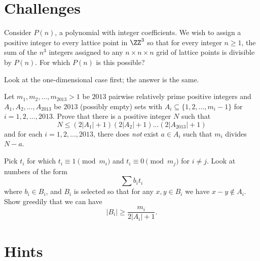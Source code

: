 \documentclass[11pt]{scrartcl}
\begin{document}
\section{Challenges}
\begin{problem}
  Consider $P(n)$, a polynomial with integer coefficients.
  We wish to assign a positive integer to every lattice point in
  $\ZZ^3$ so that for every integer $n \ge 1$,
  the sum of the $n^3$ integers assigned to any $n \times n \times n$ grid
  of lattice points is divisible by $P(n)$.
  For which $P(n)$ is this possible?
  \begin{hint}
    Look at the one-dimensional case first;
    the answer is the same.
  \end{hint}
\end{problem}

\begin{problem}
  Let $m_1,m_2,\ldots,m_{2013} > 1$ be $2013$
  pairwise relatively prime positive integers
  and $A_1,A_2,\ldots,A_{2013}$ be $2013$ (possibly empty) sets
  with $A_i\subseteq \{1,2,\ldots,m_i-1\}$ for $i=1,2,\ldots,2013$.
  Prove that there is a positive integer $N$ such that
   \[ N \le \left( 2\left\lvert A_1 \right\rvert + 1 \right)
     \left( 2\left\lvert A_2 \right\rvert + 1 \right)
     \dots\left( 2\left\lvert A_{2013} \right\rvert + 1 \right) \]
  and for each $i = 1, 2, \ldots, 2013$,
  there does \emph{not} exist $a \in A_i$ such that $m_i$ divides $N-a$.
  \begin{hint}
    Pick $t_i$ for which $t_i \equiv 1 \pmod{m_i}$ and $t_i \equiv 0 \pmod{m_j}$ for $i \neq j$.
    Look at numbers of the form \[ \sum b_i t_i \] where $b_i \in B_i$,
    and $B_i$ is selected so that for any $x,y \in B_i$
    we have $x-y \notin A_i$.
    Show greedily that we can have \[ \left\lvert B_i \right\rvert \ge \frac{m_i}{2\left\lvert A_i \right\rvert+1}. \]
  \end{hint}
\end{problem}


\eject
\section{Hints}
\begin{enumerate}

\end{enumerate}
\end{document}
